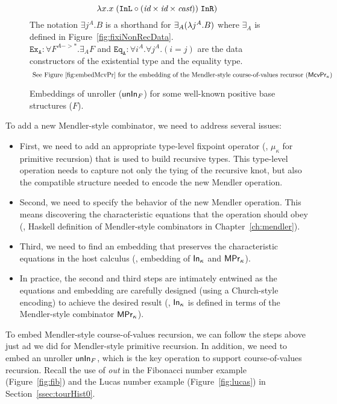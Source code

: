 {\begin{landscape}
\begin{figure}
\[\lambda x. x \;(\texttt{InL}\circ
		(\textit{id}\times\textit{id}\times\textit{cast}))
	\;\texttt{InR})
\]
The notation $\exists j^A.B$ is a shorthand for $\exists_A(\lambda j^A.B)$
where $\exists_A$ is defined in Figure~\ref{fig:fixiNonRecData}.\\
$\mathtt{Ex_{A}} : \forall F^{A -> *}.\exists_A F$ and
$\mathtt{Eq_{A}} : \forall i^A.\forall j^A.(i=j)$ are
the data constructors of the existential type and the equality type.
\[\text{
See Figure \ref{fig:embedMcvPr} for the embedding of the Mendler-style
course-of-values recursor ($\mathsf{McvPr}_\kappa$)}
\]
\caption{Embeddings of unroller ($\mathsf{unIn}_F$)
	for some well-known positive base structures ($F$).}
\label{fig:unInExamples}
\end{figure}

\end{landscape}
} %

To add a new Mendler-style combinator, we need to address several issues:
\begin{itemize}
\item First, we need to add an appropriate type-level fixpoint operator
	(\eg, $\mu_\kappa$ for primitive recursion)
that is used to build recursive types. This type-level operation needs to
capture not only the tying of the recursive knot, but also the compatible
structure needed to encode the new Mendler operation.
\item Second, we need to specify the behavior of the new Mendler operation.
	This means discovering the characteristic equations
	that the operation should obey
	(\eg, Haskell definition of Mendler-style combinators
	in Chapter~\ref{ch:mendler}).
\item Third, we need to find an embedding that preserves
	the characteristic equations in the host calculus
	(\eg, embedding of $\mathsf{In}_\kappa$ and $\mathsf{MPr}_\kappa$).
\item In practice, the second and third steps are intimately entwined as
the equations and embedding are carefully designed
(using a Church-style encoding) to achieve the desired result
(\eg, $\mathsf{In}_\kappa$ is defined in terms of
	the Mendler-style combinator $\mathsf{MPr}_\kappa$).
\end{itemize}

To embed Mendler-style course-of-values recursion, we can follow the steps above
just ad we did for Mendler-style primitive recursion. In addition, we need
to embed an unroller $\mathsf{unIn}_F$, which is the key operation to support
course-of-values recursion. Recall the use of \textit{out} in the Fibonacci
number example (Figure~\ref{fig:fib}) and the Lucas number example
(Figure~\ref{fig:lucas}) in Section~\ref{ssec:tourHist0}.

